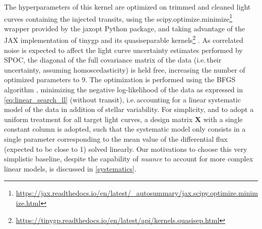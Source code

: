 \documentclass[modern]{aastex631}
\newcommand{\nuancemethod}{\textit{nuance}}
\newcommand{\footlink}[1]{\footnote{\url{#1}}}
\begin{document}
The hyperparameters of this kernel are optimized on trimmed and cleaned light curves containing the injected transits, using the \textsf{scipy.optimize.minimize}\footlink{https://jax.readthedocs.io/en/latest/_autosummary/jax.scipy.optimize.minimize.html} wrapper provided by the \textsf{jaxopt} Python package, and taking advantage of the \textsf{JAX} implementation of \textsf{tinygp} and its quasiseparable kernels\footlink{https://tinygp.readthedocs.io/en/latest/api/kernels.quasisep.html} \citep{celerite}. As correlated noise is expected to affect the light curve uncertainty estimates performed by SPOC, the diagonal of the full covariance matrix of the data (i.e.\,their uncertainty, assuming homoscedasticity) is held free, increasing the number of optimized parameters to 9. The optimization is performed using the \textsf{BFGS} algorithm \citep{Fletcher1987}, minimizing the negative log-likelihood of the data as expressed in \autoref{eq:linear_search_ll} (without transit), i.e.\,accounting for a linear systematic model of the data in addition of stellar variability. For simplicity, and to adopt a uniform treatment for all target light curves, a design matrix $\bm{X}$ with a single constant column is adopted, such that the systematic model only consists in a single parameter corresponding to the mean value of the differential flux (expected to be close to 1) solved linearly. Our motivations to choose this very simplistic baseline, despite the capability of \nuancemethod{} to account for more complex linear models, is discussed in \autoref{systematics}.
\end{document}

